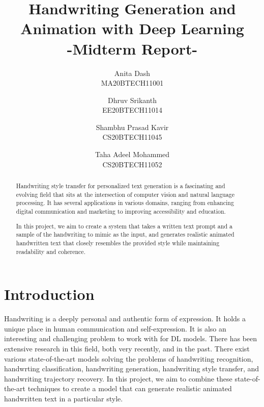 \documentclass[10pt,twocolumn,letterpaper]{article}
\begin{document}
\title{Handwriting Generation and Animation with Deep Learning\\-Midterm Report-}

\author{Anita Dash\\
MA20BTECH11001\\
\and
Dhruv Srikanth\\
EE20BTECH11014\\
\and
Shambhu Prasad Kavir\\
CS20BTECH11045\\
\and
Taha Adeel Mohammed\\
CS20BTECH11052\\
}

\maketitle

\begin{abstract}
   Handwriting style transfer for personalized text generation is a fascinating and evolving field that sits at the intersection of computer vision and natural language processing. It has several applications in various domains, ranging from enhancing digital communication and marketing to improving accessibility and education.

   In this project, we aim to create a system that takes a written text prompt and a sample of the handwriting to mimic as the input, and generates realistic animated handwritten text that closely resembles the provided style while maintaining readability and coherence.
\end{abstract}

\section{Introduction}
\label{sec:introduction}
Handwriting is a deeply personal and authentic form of expression. It holds a unique place in human communication and self-expression. It is also an interesting and challenging problem to work with for DL models. There has been extensive research in this field, both very recently, and in the past. There exist various state-of-the-art models solving the problems of handwriting recognition, handwrting classification, handwriting generation, handwriting style transfer, and handwriting trajectory recovery. In this project, we aim to combine these state-of-the-art techniques to create a model that can generate realistic animated handwritten text in a particular style.
\end{document}
